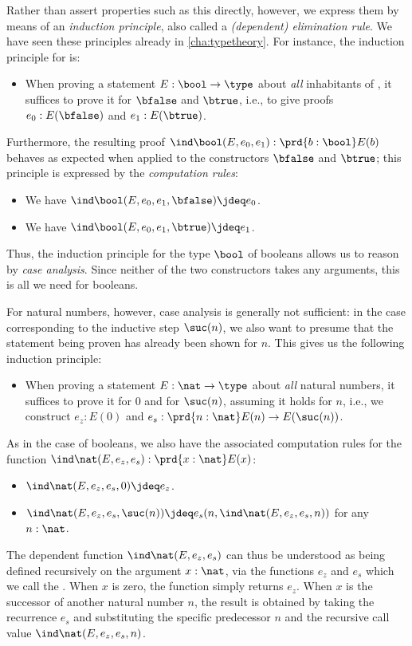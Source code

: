 %
Rather than assert properties such as this directly, however, we express them by means of an \emph{induction principle}, also called a \emph{(dependent) elimination rule}.
We have seen these principles already in \cref{cha:typetheory}.
For instance, the induction principle for \bool is:
%
\begin{itemize}
\item When proving a statement $E : \bool \to \type$ about \emph{all} inhabitants of \bool, it suffices to prove it for $\bfalse$ and $\btrue$, i.e., to give proofs $e_0 : E(\bfalse)$ and $e_1 : E(\btrue)$.
\end{itemize}

Furthermore, the resulting proof $\ind\bool(E,e_0,e_1): \prd{b : \bool}E(b)$ behaves as expected when applied to the constructors $\bfalse$ and $\btrue$; this principle is expressed by the \emph{computation rules}:
\begin{itemize}
\item We have $\ind\bool(E,e_0,e_1,\bfalse) \jdeq e_0$.
\item We have $\ind\bool(E,e_0,e_1,\btrue) \jdeq e_1$.
\end{itemize}

%
Thus, the induction principle for the type $\bool$ of booleans allows us to reason by \emph{case analysis}.
Since neither of the two constructors takes any arguments, this is all we need for booleans.

%
For natural numbers, however, case analysis is generally not sufficient: in the case corresponding to the inductive step $\suc(n)$, we also want to presume that the statement being proven has already been shown for $n$.
This gives us the following induction principle:
\begin{itemize}
\item When proving a statement $E : \nat \to \type$ about \emph{all} natural numbers, it suffices to prove it for $0$ and for $\suc(n)$, assuming it holds
for $n$, i.e., we construct $e_z : E(0)$ and $e_s : \prd{n : \nat} E(n) \to E(\suc(n))$.
\end{itemize}
As in the case of booleans, we also have the associated computation rules for the function $\ind\nat(E,e_z,e_s) : \prd{x:\nat} E(x)$:
%
\begin{itemize}
\item $\ind\nat(E,e_z,e_s,0) \jdeq e_z$.
\item $\ind\nat(E,e_z,e_s,\suc(n)) \jdeq e_s(n,\ind\nat(E,e_z,e_s,n))$ for any $n : \nat$.
\end{itemize}
The dependent function $\ind\nat(E,e_z,e_s)$ can thus be understood as being defined recursively on the argument $x : \nat$, via the functions $e_z$ and $e_s$ which we call the .
When $x$ is zero, the function simply returns $e_z$.
When $x$ is the successor of another natural number $n$, the result is obtained by taking the recurrence $e_s$ and substituting the specific predecessor $n$ and the recursive call value $\ind\nat(E,e_z,e_s,n)$.


